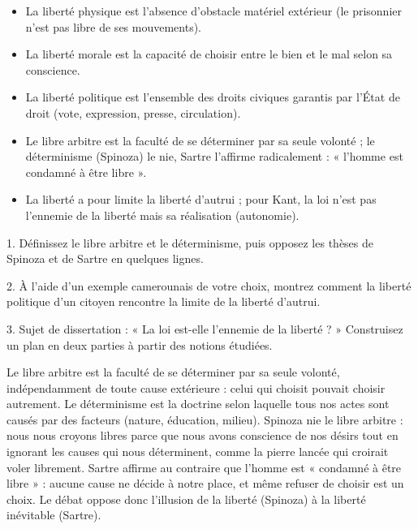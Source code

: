 \documentclass[11pt]{article}
\newcommand{\cle}[1]{{\popxbold\color{popdark}#1}}
\begin{document}
\begin{aretenir}
\begin{itemize}
\item La \cle{liberté physique} est l'absence d'obstacle matériel extérieur (le prisonnier n'est pas libre de ses mouvements).
\item La \cle{liberté morale} est la capacité de choisir entre le bien et le mal selon sa conscience.
\item La \cle{liberté politique} est l'ensemble des droits civiques garantis par l'État de droit (vote, expression, presse, circulation).
\item Le \cle{libre arbitre} est la faculté de se déterminer par sa seule volonté ; le \cle{déterminisme} (Spinoza) le nie, Sartre l'affirme radicalement : « l'homme est condamné à être libre ».
\item La liberté a pour limite la liberté d'autrui ; pour Kant, la loi n'est pas l'ennemie de la liberté mais sa réalisation (autonomie).
\end{itemize}
\end{aretenir}

\begin{exercice}
1. Définissez le libre arbitre et le déterminisme, puis opposez les thèses de Spinoza et de Sartre en quelques lignes.

2. À l'aide d'un exemple camerounais de votre choix, montrez comment la liberté politique d'un citoyen rencontre la limite de la liberté d'autrui.

3. Sujet de dissertation : « La loi est-elle l'ennemie de la liberté ? » Construisez un plan en deux parties à partir des notions étudiées.
\end{exercice}

\begin{corrige}[Exercice 1]
Le libre arbitre est la faculté de se déterminer par sa seule volonté, indépendamment de toute cause extérieure : celui qui choisit pouvait choisir autrement. Le déterminisme est la doctrine selon laquelle tous nos actes sont causés par des facteurs (nature, éducation, milieu). Spinoza nie le libre arbitre : nous nous croyons libres parce que nous avons conscience de nos désirs tout en ignorant les causes qui nous déterminent, comme la pierre lancée qui croirait voler librement. Sartre affirme au contraire que l'homme est « condamné à être libre » : aucune cause ne décide à notre place, et même refuser de choisir est un choix. Le débat oppose donc l'illusion de la liberté (Spinoza) à la liberté inévitable (Sartre).
\end{corrige}
\end{document}
